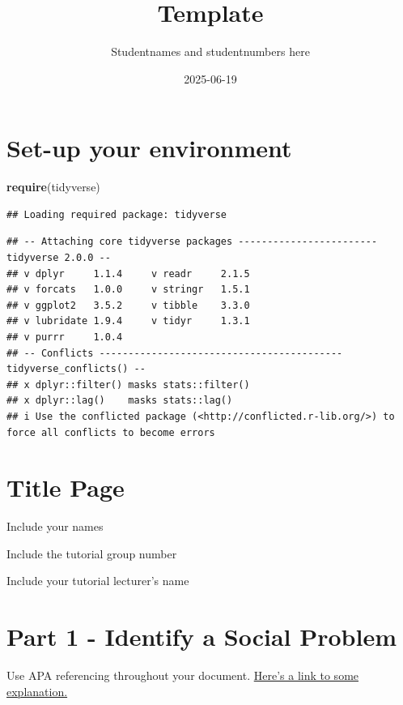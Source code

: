 \documentclass[
]{article}
\title{Template}
\author{Studentnames and studentnumbers here}
\date{2025-06-19}
\newenvironment{Shaded}{\begin{snugshade}}{\end{snugshade}}
\newcommand{\FunctionTok}[1]{\textcolor[rgb]{0.13,0.29,0.53}{\textbf{#1}}}
\newcommand{\NormalTok}[1]{#1}
\begin{document}
\maketitle

\section{Set-up your environment}\label{set-up-your-environment}

\begin{Shaded}
\begin{Highlighting}[]
\FunctionTok{require}\NormalTok{(tidyverse)}
\end{Highlighting}
\end{Shaded}

\begin{verbatim}
## Loading required package: tidyverse
\end{verbatim}

\begin{verbatim}
## -- Attaching core tidyverse packages ------------------------ tidyverse 2.0.0 --
## v dplyr     1.1.4     v readr     2.1.5
## v forcats   1.0.0     v stringr   1.5.1
## v ggplot2   3.5.2     v tibble    3.3.0
## v lubridate 1.9.4     v tidyr     1.3.1
## v purrr     1.0.4     
## -- Conflicts ------------------------------------------ tidyverse_conflicts() --
## x dplyr::filter() masks stats::filter()
## x dplyr::lag()    masks stats::lag()
## i Use the conflicted package (<http://conflicted.r-lib.org/>) to force all conflicts to become errors
\end{verbatim}

\section{Title Page}\label{title-page}

Include your names

Include the tutorial group number

Include your tutorial lecturer's name

\section{Part 1 - Identify a Social
Problem}\label{part-1---identify-a-social-problem}

Use APA referencing throughout your document.
\href{https://www.mendeley.com/guides/apa-citation-guide/}{Here's a link
to some explanation.}
\end{document}
